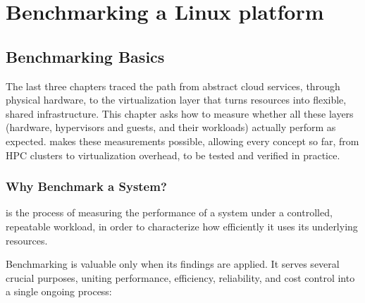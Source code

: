 \chapter{Benchmarking a Linux platform} \label{ch:benchmarking}

\section{Benchmarking Basics}

The last three chapters traced the path from abstract cloud services, through physical hardware, to the virtualization layer that turns resources into flexible, shared infrastructure. This chapter asks how to measure whether all these layers (hardware, hypervisors and guests, and their workloads) actually perform as expected.  makes these measurements possible, allowing every concept so far, from HPC clusters to virtualization overhead, to be tested and verified in practice.


\subsection{Why Benchmark a System?} \label{sec:why_benchmark}

\begin{definitionblock}[Benchmarking]
 is the process of measuring the performance of a system under a controlled, repeatable workload, in order to characterize how efficiently it uses its underlying resources.
\end{definitionblock}

Benchmarking is valuable only when its findings are applied. It serves several crucial purposes, uniting performance, efficiency, reliability, and cost control into a single ongoing process:

\medskip

